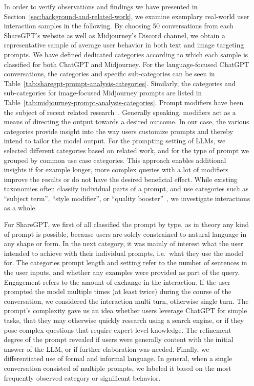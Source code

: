 In order to verify observations and findings we have presented in Section~\ref{sec:background-and-related-work},
we examine exemplary real-world user interaction samples in the following.
By choosing 50 conversations from each ShareGPT's website as well as Midjourney's Discord
channel, we obtain a representative sample of average user behavior in both text and image targeting prompts.
We have defined dedicated categories according to which each sample is classified for both
ChatGPT and Midjourney.
For the language-focused ChatGPT conversations, the categories and specific sub-categories can be
seen in Table~\ref{tab:sharegpt-prompt-analysis-categories}.
Similarly, the categories and sub-categories for image-focused Midjourney prompts are listed
in Table~\ref{tab:midjourney-prompt-analysis-categories}.
Prompt modifiers have been the subject of recent related research~\cite{oppenlaender_taxonomy_2023}.
Generally speaking, modifiers act as a means of directing the output towards a desired outcome.
In our case, the various categories provide insight into the way users customize prompts and
thereby intend to tailor the model output.
For the prompting setting of LLMs, we selected different categories based on related work,
and for the type of prompt we grouped by common use case categories.
This approach enables additional insights if for example longer, more complex queries with a
lot of modifiers improve the results or do not have the desired beneficial effect.
While existing taxonomies often classify individual parts of a prompt, and use
categories such as ``subject term'', ``style modifier'', or ``quality booster''~\cite{oppenlaender_taxonomy_2023}, we
investigate interactions as a whole.

For ShareGPT, we first of all classified the prompt by type, as in theory any kind of prompt is
possible, because users are solely constrained to natural language in any shape or form.
In the next category, it was mainly of interest what the user intended to achieve with their
individual prompts,
i.e.\ what they use the model for.
The categories prompt length and setting refer to the number of sentences in the user inputs, and
whether any examples were provided as part of the query.
Engagement refers to the amount of exchange in the interaction.
If the user prompted the model multiple times (at least twice) during the course of the
conversation, we considered the interaction multi turn, otherwise single turn.
The prompt's complexity gave us an idea whether users leverage ChatGPT for simple
tasks, that they may otherwise quickly research using a search engine, or if they pose complex
questions that require expert-level knowledge.
The refinement degree of the prompt revealed if users were generally content with the initial
answer of the LLM, or if further elaboration was needed.
Finally, we differentiated use of formal and informal language.
In general, when a single conversation consisted of multiple prompts, we labeled it based on the
most frequently observed category or significant behavior.

